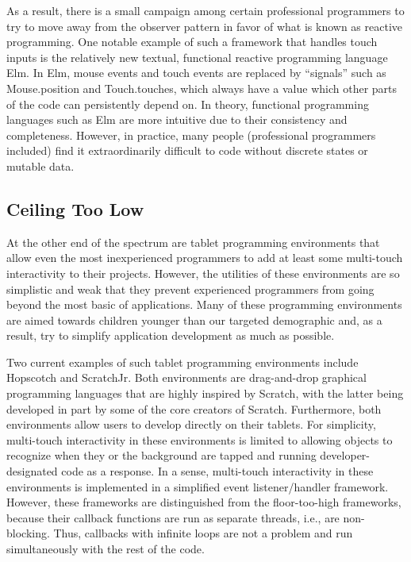 As a result, there is a small campaign among certain professional programmers to try to move away from the observer pattern in favor of what is known as reactive programming\cite{Maier, vanderPloeg}. One notable example of such a framework that handles touch inputs is the relatively new textual, functional reactive programming language Elm\cite{Elm}. In Elm, mouse events and touch events are replaced by ``signals'' such as Mouse.position and Touch.touches, which always have a value which other parts of the code can persistently depend on. In theory, functional programming languages such as Elm are more intuitive due to their consistency and completeness. However, in practice, many people (professional programmers included) find it extraordinarily difficult to code without discrete states or mutable data.

\subsection{Ceiling Too Low}
At the other end of the spectrum are tablet programming environments that allow even the most inexperienced programmers to add at least some multi-touch interactivity to their projects. However, the utilities of these environments are so simplistic and weak that they prevent experienced programmers from going beyond the most basic of applications. Many of these programming environments are aimed towards children younger than our targeted demographic and, as a result, try to simplify application development as much as possible. 

Two current examples of such tablet programming environments include Hopscotch\cite{Hopscotch} and ScratchJr\cite{ScratchJr}. Both environments are drag-and-drop graphical programming languages that are highly inspired by Scratch, with the latter being developed in part by some of the core creators of Scratch. Furthermore, both environments allow users to develop directly on their tablets. For simplicity, multi-touch interactivity in these environments is limited to allowing objects to recognize when they or the background are tapped and running developer-designated code as a response. In a sense, multi-touch interactivity in these environments is implemented in a simplified event listener/handler framework. However, these frameworks are distinguished from the floor-too-high frameworks, because their callback functions are run as separate threads, i.e., are non-blocking. Thus, callbacks with infinite loops are not a problem and run simultaneously with the rest of the code.

